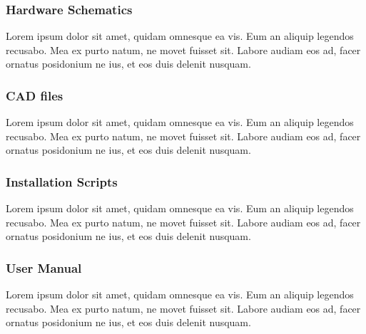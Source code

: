 \subsubsection{Hardware Schematics}
Lorem ipsum dolor sit amet, quidam omnesque ea vis. Eum an aliquip legendos recusabo. Mea ex purto natum, ne movet fuisset sit. Labore audiam eos ad, facer ornatus posidonium ne ius, et eos duis delenit nusquam.

\subsubsection{CAD files}
Lorem ipsum dolor sit amet, quidam omnesque ea vis. Eum an aliquip legendos recusabo. Mea ex purto natum, ne movet fuisset sit. Labore audiam eos ad, facer ornatus posidonium ne ius, et eos duis delenit nusquam.

\subsubsection{Installation Scripts}
Lorem ipsum dolor sit amet, quidam omnesque ea vis. Eum an aliquip legendos recusabo. Mea ex purto natum, ne movet fuisset sit. Labore audiam eos ad, facer ornatus posidonium ne ius, et eos duis delenit nusquam.

\subsubsection{User Manual}
Lorem ipsum dolor sit amet, quidam omnesque ea vis. Eum an aliquip legendos recusabo. Mea ex purto natum, ne movet fuisset sit. Labore audiam eos ad, facer ornatus posidonium ne ius, et eos duis delenit nusquam.
